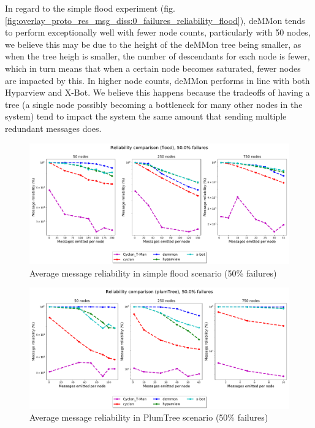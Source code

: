 In regard to the simple flood experiment (fig. \ref{fig:overlay_proto_res_msg_diss:0_failures_reliability_flood}), deMMon tends to perform exceptionally well with fewer node counts, particularly with 50 nodes, we believe this may be due to the height of the deMMon tree being smaller, as when the tree heigh is smaller, the number of descendants for each node is fewer, which in turn means that when a certain node becomes saturated, fewer nodes are impacted by this. In higher node counts, deMMon performs in line with both Hyparview and X-Bot. We believe this happens because the tradeoffs of having a tree (a single node possibly becoming a bottleneck for many other nodes in the system) tend to impact the system the same amount that sending multiple redundant messages does. 

\begin{figure}[htbp]
    \centering
    \includegraphics[width=\linewidth]{Chapters/evaluation/figures/flood/flood_50.0_failures_reliability.pdf}
    \caption{Average message reliability in simple flood scenario (50\% failures)}
    \label{fig:overlay_proto_res_msg_diss:50_failures_reliability_flood}
\end{figure}

\begin{figure}[htbp]
    \centering
    \includegraphics[width=\linewidth]{Chapters/evaluation/figures/flood/plumTree_50.0_failures_reliability.pdf}
    \caption{Average message reliability in PlumTree scenario (50\% failures)}
    \label{fig:overlay_proto_res_msg_diss:50_failures_reliability_plumTree}
\end{figure}

